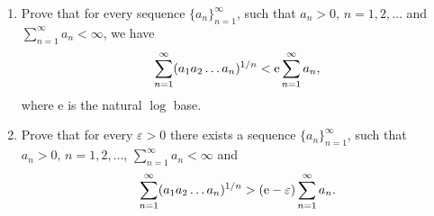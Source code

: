 \documentclass{article}
\begin{document}
	\setlength{\parindent}{0pt}
	\begin{enumerate}[label=(\roman*)]
		\item Prove that for every sequence $\{a_n\}_{n=1}^\infty$, such that $a_n>0,\, n=1,2,\dots$ and $\sum_{n=1}^{\infty}a_n<\infty$, we have
		$$\sum_{n=1}^{\infty}(a_1a_2\dots a_n)^{1/n}<\textup{e}\sum_{n=1}^{\infty}a_n,$$
		where \textup{e} is the natural $\log$ base.
		\item  Prove that for every $\varepsilon>0$ there exists a sequence $\{a_n\}_{n=1}^\infty$, such that $a_n>0,\, n=1,2,\dots$, $\sum_{n=1}^{\infty}a_n<\infty$ and 
		$$\sum_{n=1}^{\infty}(a_1a_2\dots a_n)^{1/n}>(\textup{e}-\varepsilon)\sum_{n=1}^{\infty} a_n.$$
	\end{enumerate}
\end{document}
